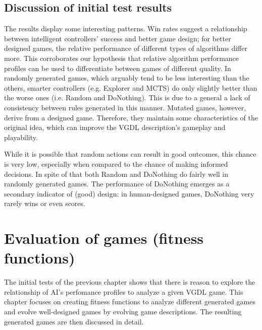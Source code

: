\documentclass[a4paper,titlepage,final]{report}
\begin{document}
\section{Discussion of initial test results}
\label{sec_discussionofinitialtest}
The results display some interesting patterns. Win rates suggest a relationship between intelligent controllers' success and better game design; for better designed games, the relative performance of different types of algorithms differ more. This corroborates our hypothesis that relative algorithm performance profiles can be used to differentiate between games of different quality. In randomly generated games, which arguably tend to be less interesting than the others, smarter controllers (e.g. Explorer and MCTS) do only slightly better than the worse ones (i.e. Random and DoNothing). This is due to a general a lack of consistency between rules generated in this manner. Mutated games, however, derive from a designed game. Therefore, they maintain some characteristics of the original idea, which can improve the VGDL description's gameplay and playability. %

While it is possible that random actions can result in good outcomes, this chance is very low, especially when compared to the chance of making informed decisions. In spite of that both Random and DoNothing do fairly well in randomly generated games. The performance of DoNothing emerges as a secondary indicator of (good) design: in human-designed games, DoNothing very rarely wins or even scores.


\chapter{Evaluation of games (fitness functions)}

The initial tests of the previous chapter shows that there is reason to explore the relationship of AI's perfomance profiles to analyze a given VGDL game.
This chapter focuses on creating fitness functions to analyze different generated games and evolve well-designed games by evolving game descriptions. 
The resulting generated games are then discussed in detail.
\end{document}
